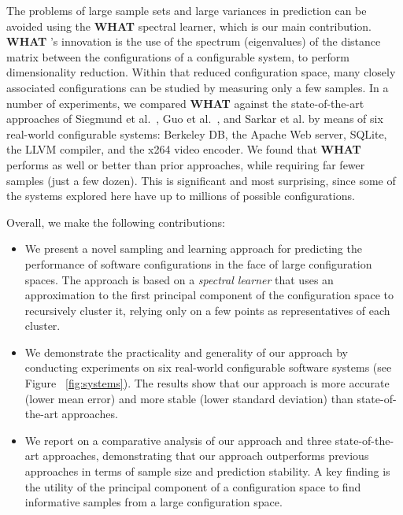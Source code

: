 \documentclass{newsig}
\newcommand{\what}{{\bf WHAT }}
\begin{document}
The problems of large sample sets and large variances in prediction can be avoided using the \what spectral learner, which is our main contribution.  
{\what}'s innovation is  the use of the spectrum (eigenvalues) of the distance matrix
between the configurations of a configurable system, to perform dimensionality reduction. Within that
reduced configuration space, many closely associated configurations can be studied
by measuring only a few samples.
In a number of experiments, we compared \what against the state-of-the-art approaches of Siegmund et al.~\cite{siegmund2012predicting}, Guo et al.~\cite{guo2013variability}, and Sarkar et al. \cite{sarkar2015cost} by means of six real-world configurable systems: Berkeley DB,  the Apache Web server, SQLite, the LLVM compiler, and the x264 video encoder.
We found that \what performs as well or better than prior approaches,
while  requiring far fewer samples (just a few dozen).
This is significant and most surprising, since some of the systems explored here have up to millions of possible configurations. 

Overall, we make the following contributions:
\begin{itemize}
\item We present a novel sampling and learning approach for predicting the performance of software configurations in the face of large configuration spaces. The approach is based on a
{\em spectral
learner} that uses an approximation to the first principal component of the configuration space to recursively cluster it, relying only on a few points as representatives of each cluster.
\item We demonstrate the practicality and generality of our approach by conducting experiments on six real-world configurable software systems (see Figure ~\ref{fig:systems}). The results show that our approach is more accurate (lower mean error) and more stable (lower standard deviation) than state-of-the-art approaches.
\item We report on a comparative analysis of our approach and three state-of-the-art approaches, demonstrating that our approach outperforms previous approaches in terms of sample size and prediction stability. A key finding is the utility of the principal component of a configuration space to  find informative samples from a large configuration space.
\end{itemize}
\end{document}
